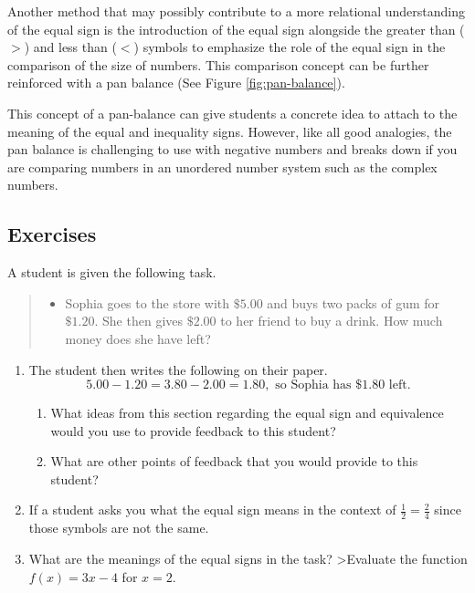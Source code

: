 \documentclass[
]{book}
\providecommand{\tightlist}{%
  \setlength{\itemsep}{0pt}\setlength{\parskip}{0pt}}
\theoremstyle{definition}
\theoremstyle{definition}
\theoremstyle{definition}
\theoremstyle{remark}
\begin{document}
Another method that may possibly contribute to a more relational understanding of the equal sign is the introduction of the equal sign alongside the greater than (\(>\)) and less than (\(<\)) symbols to emphasize the role of the equal sign in the comparison of the size of numbers. This comparison concept can be further reinforced with a pan balance (See Figure \ref{fig:pan-balance}).

This concept of a pan-balance can give students a concrete idea to attach to the meaning of the equal and inequality signs. However, like all good analogies, the pan balance is challenging to use with negative numbers and breaks down if you are comparing numbers in an unordered number system such as the complex numbers.

\hypertarget{exercises-8}{%
\subsection{Exercises}\label{exercises-8}}

A student is given the following task.

\begin{quote}
\begin{itemize}
\tightlist
\item
  Sophia goes to the store with \(\$5.00\) and buys two packs of gum for \(\$1.20\). She then gives \(\$2.00\) to her friend to buy a drink. How much money does she have left?
\end{itemize}
\end{quote}

\begin{enumerate}
\def\labelenumi{\arabic{enumi}.}
\item
  The student then writes the following on their paper.
  \[5.00-1.20=3.80-2.00=1.80, \mbox{ so Sophia has } \$1.80 \mbox{ left.}\]

  \begin{enumerate}
  \def\labelenumii{\alph{enumii}.}
  \item
    What ideas from this section regarding the equal sign and equivalence would you use to provide feedback to this student?
  \item
    What are other points of feedback that you would provide to this student?
  \end{enumerate}
\item
  If a student asks you what the equal sign means in the context of \(\frac{1}{2}=\frac{2}{4}\) since those symbols are not the same.
\item
  What are the meanings of the equal signs in the task?
  \textgreater Evaluate the function \(f(x)=3x-4\) for \(x=2\).
\end{enumerate}
\end{document}
